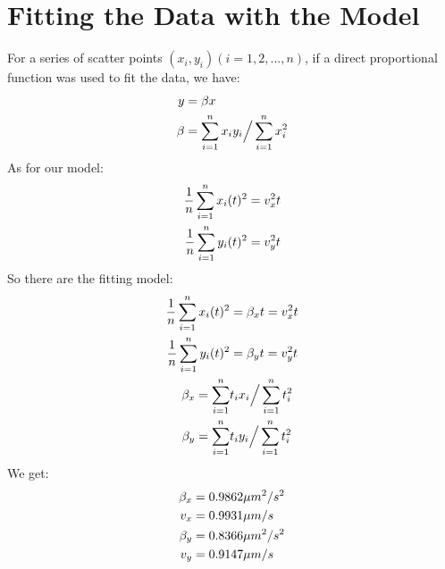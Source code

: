 \section{Fitting the Data with the Model}
For a series of scatter points $(x_i, y_i)(i=1,2,...,n)$, if a direct proportional function was used to fit the data, we have:\\
\begin{equation*} 
\begin{aligned} 
\centering
y     &= \beta x \\
\beta &= \sum_{i=1}^n x_i y_i \Big / \sum_{i=1}^n x_i^2 \\
\end{aligned} 
\end{equation*}
As for our model: \\
\begin{equation*} 
\begin{aligned} 
\centering
\frac{1}{n} \sum_{i=1}^{n}x_i(t)^2 &= v_x^2t \\
\frac{1}{n} \sum_{i=1}^{n}y_i(t)^2 &= v_y^2t \\
\end{aligned} 
\end{equation*}
So there are the fitting model: \\
\begin{equation*} 
\begin{aligned} 
\centering
\frac{1}{n} \sum_{i=1}^{n}x_i(t)^2 &= \beta_x t = v_x^2t \\
\frac{1}{n} \sum_{i=1}^{n}y_i(t)^2 &= \beta_y t = v_y^2t \\
\beta_x = \sum_{i=1}^n & t_i x_i \Big / \sum_{i=1}^n t_i^2 \\
\beta_y = \sum_{i=1}^n & t_i y_i \Big / \sum_{i=1}^n t_i^2 \\
\end{aligned} 
\end{equation*}
We get: \\
\begin{equation*} 
\begin{aligned} 
\centering
\beta_x &= 0.9862 \mu m^2 /s^2 \\
v_x &= 0.9931 \mu m /s \\
\beta_y &= 0.8366 \mu m^2 /s^2 \\
v_y &= 0.9147 \mu m /s \\
\end{aligned} 
\end{equation*}
